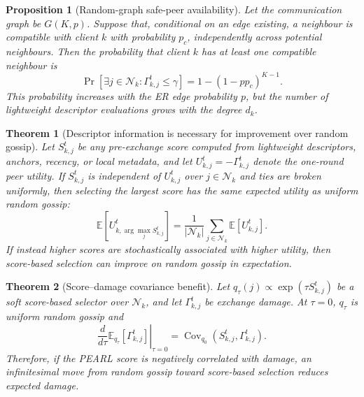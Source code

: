 \documentclass[conference]{IEEEtran}
\newtheorem{proposition}{Proposition}
\newtheorem{theorem}{Theorem}
\begin{document}
\begin{proposition}[Random-graph safe-peer availability]
\label{prop:er_safe_peer_availability}
Let the communication graph be \(G(K,p)\). Suppose that, conditional on an edge existing, a neighbour is compatible with client \(k\) with probability \(p_c\), independently across potential neighbours. Then the probability that client \(k\) has at least one compatible neighbour is
\begin{equation*}
\Pr\!\left[
\exists j\in\mathcal{N}_k:
\Gamma_{k,j}^t\leq\gamma
\right]
=
1-(1-pp_c)^{K-1}.
\end{equation*}
This probability increases with the ER edge probability \(p\), but the number of lightweight descriptor evaluations grows with the degree \(d_k\).
\end{proposition}

\begin{theorem}[Descriptor information is necessary for improvement over random gossip]
\label{thm:descriptor_information_necessity}
Let \(S_{k,j}^t\) be any pre-exchange score computed from lightweight descriptors, anchors, recency, or local metadata, and let \(U_{k,j}^t=-\Gamma_{k,j}^t\) denote the one-round peer utility. If \(S_{k,j}^t\) is independent of \(U_{k,j}^t\) over \(j\in\mathcal{N}_k\) and ties are broken uniformly, then selecting the largest score has the same expected utility as uniform random gossip:
\begin{equation*}
\mathbb{E}\!\left[
U_{k,\arg\max_j S_{k,j}^t}^t
\right]
=
\frac{1}{|\mathcal{N}_k|}
\sum_{j\in\mathcal{N}_k}
\mathbb{E}[U_{k,j}^t].
\end{equation*}
If instead higher scores are stochastically associated with higher utility, then score-based selection can improve on random gossip in expectation.
\end{theorem}

\begin{theorem}[Score--damage covariance benefit]
\label{thm:score_damage_covariance}
Let \(q_\tau(j)\propto \exp(\tau S_{k,j}^t)\) be a soft score-based selector over \(\mathcal{N}_k\), and let \(\Gamma_{k,j}^t\) be exchange damage. At \(\tau=0\), \(q_\tau\) is uniform random gossip and
\begin{equation*}
\left.
\frac{d}{d\tau}
\mathbb{E}_{q_\tau}[\Gamma_{k,j}^t]
\right|_{\tau=0}
=
\operatorname{Cov}_{q_0}(S_{k,j}^t,\Gamma_{k,j}^t).
\end{equation*}
Therefore, if the PEARL score is negatively correlated with damage, an infinitesimal move from random gossip toward score-based selection reduces expected damage.
\end{theorem}
\end{document}

